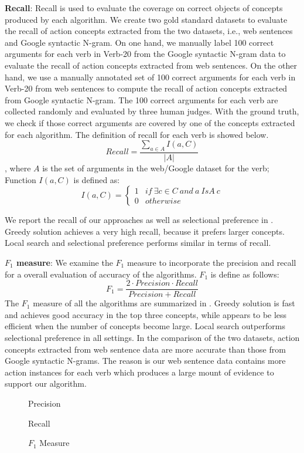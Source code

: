 \textbf{Recall}: Recall is used to evaluate the coverage on correct
objects of concepts produced by each algorithm.
We create two gold standard datasets to evaluate
the recall of action concepts extracted from the
two datasets, i.e., web sentences and Google syntactic
N-gram. On one hand, we manually label 100 correct arguments for each
verb in Verb-20 from the Google syntactic N-gram data
to evaluate the recall of action concepts extracted
from web sentences. On the other hand, we use a
manually annotated set of 100 correct arguments for
each verb in Verb-20 from web sentences to compute
the recall of action concepts extracted from Google
syntactic N-gram. The 100 correct arguments for
each verb are collected randomly and evaluated
by three human judges. With the ground truth, we check
if those correct arguments are covered by one of the concepts
extracted for each algorithm. The definition of recall for each verb
is showed below.
$$
Recall=\frac{\sum_{a \in A}{I(a,C)}}{|A|}
$$
, where $A$ is the set of arguments in the web/Google dataset
for the verb; Function $I(a,C)$ is defined as:
$$
I(a,C)=
\begin{cases}
1 & if\ \exists c \in C\ and\ a\ IsA\ c\\
0 & otherwise
\end{cases}
$$

We report the recall of our approaches as well as
selectional preference in .
Greedy solution achieves a very high recall, because
it prefers larger concepts. Local search and selectional
preference performs similar in terms of recall.

\textbf{$F_1$ measure}: We examine the $F_1$ measure to
incorporate the precision and recall for a overall
evaluation of accuracy of the algorithms. $F_1$ is
define as follows:
$$
F_1=\frac{2\cdot Precision \cdot Recall}{Precision + Recall}
$$
The $F_1$ measure of all the algorithms are summarized in
. Greedy solution is fast and achieves good accuracy
in the top three concepts, while appears to be less efficient
when the number of concepts become large.
Local search outperforms
selectional preference in all settings. In the comparison
of the two datasets, action concepts extracted from web sentence
data are more accurate than those from Google syntactic N-grams.
The reason is our web sentence data contains more action
instances for each verb which produces a large mount of evidence
to support our algorithm.

\begin{figure*}[th]
\begin{minipage}[t]{0.66\columnwidth}
\centering
{}
\caption{Precision}
\label{fig:precision}
\end{minipage}
\begin{minipage}[t]{0.66\columnwidth}
\centering
{}
\caption{Recall}
\label{fig:recall}
\end{minipage}
\begin{minipage}[t]{0.66\columnwidth}
\centering
{}
\caption{$F_1$ Measure}
\label{fig:f1}
\end{minipage}
\end{figure*}

